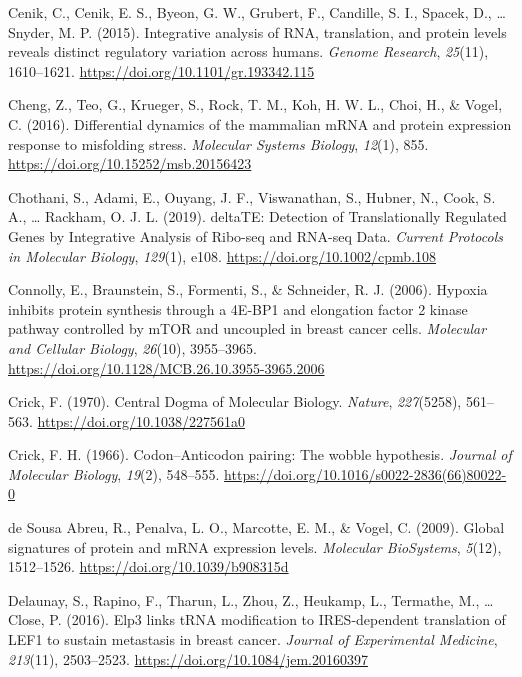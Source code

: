 \documentclass[12pt,openany]{book}
\begin{document}
\hypertarget{ref-Cenik2015}{}
Cenik, C., Cenik, E. S., Byeon, G. W., Grubert, F., Candille, S. I.,
Spacek, D., \ldots{} Snyder, M. P. (2015). Integrative analysis of RNA,
translation, and protein levels reveals distinct regulatory variation
across humans. \emph{Genome Research}, \emph{25}(11), 1610--1621.
\url{https://doi.org/10.1101/gr.193342.115}

\hypertarget{ref-Cheng2016}{}
Cheng, Z., Teo, G., Krueger, S., Rock, T. M., Koh, H. W. L., Choi, H.,
\& Vogel, C. (2016). Differential dynamics of the mammalian mRNA and
protein expression response to misfolding stress. \emph{Molecular
Systems Biology}, \emph{12}(1), 855.
\url{https://doi.org/10.15252/msb.20156423}

\hypertarget{ref-Chothani2019}{}
Chothani, S., Adami, E., Ouyang, J. F., Viswanathan, S., Hubner, N.,
Cook, S. A., \ldots{} Rackham, O. J. L. (2019). deltaTE: Detection of
Translationally Regulated Genes by Integrative Analysis of Ribo-seq and
RNA-seq Data. \emph{Current Protocols in Molecular Biology},
\emph{129}(1), e108. \url{https://doi.org/10.1002/cpmb.108}

\hypertarget{ref-Connolly2006}{}
Connolly, E., Braunstein, S., Formenti, S., \& Schneider, R. J. (2006).
Hypoxia inhibits protein synthesis through a 4E-BP1 and elongation
factor 2 kinase pathway controlled by mTOR and uncoupled in breast
cancer cells. \emph{Molecular and Cellular Biology}, \emph{26}(10),
3955--3965. \url{https://doi.org/10.1128/MCB.26.10.3955-3965.2006}

\hypertarget{ref-Crick1970}{}
Crick, F. (1970). Central Dogma of Molecular Biology. \emph{Nature},
\emph{227}(5258), 561--563. \url{https://doi.org/10.1038/227561a0}

\hypertarget{ref-Crick1966}{}
Crick, F. H. (1966). Codon--Anticodon pairing: The wobble hypothesis.
\emph{Journal of Molecular Biology}, \emph{19}(2), 548--555.
\url{https://doi.org/10.1016/s0022-2836(66)80022-0}

\hypertarget{ref-deSousaAbreu2009}{}
de Sousa Abreu, R., Penalva, L. O., Marcotte, E. M., \& Vogel, C.
(2009). Global signatures of protein and mRNA expression levels.
\emph{Molecular BioSystems}, \emph{5}(12), 1512--1526.
\url{https://doi.org/10.1039/b908315d}

\hypertarget{ref-Delaunay2016}{}
Delaunay, S., Rapino, F., Tharun, L., Zhou, Z., Heukamp, L., Termathe,
M., \ldots{} Close, P. (2016). Elp3 links tRNA modification to
IRES-dependent translation of LEF1 to sustain metastasis in breast
cancer. \emph{Journal of Experimental Medicine}, \emph{213}(11),
2503--2523. \url{https://doi.org/10.1084/jem.20160397}
\end{document}
